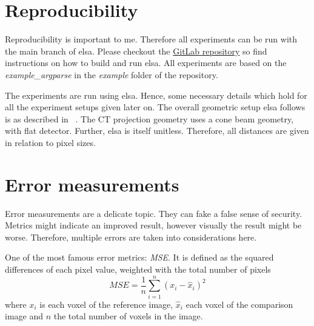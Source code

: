 \section{Reproducibility}\label{sec:experiments_repoduction}

Reproducibility is important to me. Therefore all experiments can be run with the main branch of
elsa. Please checkout the \href{https://gitlab.lrz.de/IP/elsa}{GitLab repository} so find
instructions on how to build and run elsa. All experiments are based on the
\textit{example_argparse} in the \textit{example} folder of the repository.

The experiments are run using elsa. Hence, some necessary details which hold for all the experiment
setups given later on. The overall geometric setup elsa follows is as described in
\citeauthor{hartley_multiple_2003}~\cite{hartley_multiple_2003}. The CT projection geometry uses a
cone beam geometry, with flat detector. Further, elsa is itself unitless. Therefore, all distances
are given in relation to pixel sizes.

\section{Error measurements}\label{sec:error_measurements}

Error measurements are a delicate topic. They can fake a false sense of security. Metrics might
indicate an improved result, however visually the result might be worse. Therefore, multiple errors
are taken into considerations here.

\begin{definition}
	One of the most famous error metrics: \textit{\gls{MSE}}. It is defined as the
	squared differences of each pixel value, weighted with the total number of pixels
	\[ MSE = \frac{1}{n} \sum_{i=1}^{n}(x_i - \hat{x}_i)^2\]
	where \(x_i\) is each voxel of the reference image, \(\hat{x}_i\) each voxel of the comparison
	image and \(n\) the total number of voxels in the image.
\end{definition}

